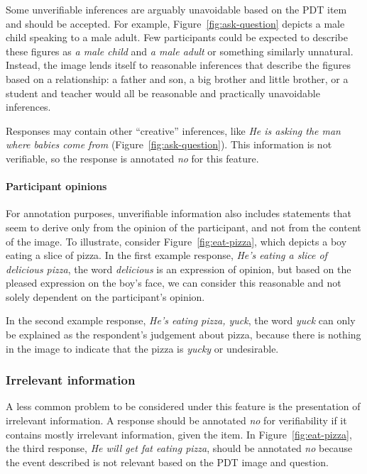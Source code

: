 \documentclass[12pt]{article}
\begin{document}
Some unverifiable inferences are arguably unavoidable based on the PDT item and should be accepted. For example, Figure~\ref{fig:ask-question} depicts a male child speaking to a male adult. Few participants could be expected to describe these figures as \textit{a male child} and \textit{a male adult} or something similarly unnatural. Instead, the image lends itself to reasonable inferences that describe the figures based on a relationship: a father and son, a big brother and little brother, or a student and teacher would all be reasonable and practically unavoidable inferences. 

Responses may contain other ``creative'' inferences, like \textit{He is asking the man where babies come from} (Figure~\ref{fig:ask-question}). This information is not verifiable, so the response is annotated \textit{no} for this feature.

\paragraph{Participant opinions} For annotation purposes, unverifiable information also includes statements that seem to derive only from the opinion of the participant, and not from the content of the image. To illustrate, consider Figure~\ref{fig:eat-pizza}, which depicts a boy eating a slice of pizza. In the first example response, \textit{He's eating a slice of delicious pizza}, the word \textit{delicious} is an expression of opinion, but based on the pleased expression on the boy's face, we can consider this reasonable and not solely dependent on the participant's opinion.

In the second example response, \textit{He's eating pizza, yuck}, the word \textit{yuck} can only be explained as the respondent's judgement about pizza, because there is nothing in the image to indicate that the pizza is \textit{yucky} or undesirable. 

\subsubsection{Irrelevant information} 
A less common problem to be considered under this feature is the presentation of irrelevant information. A response should be annotated \textit{no} for verifiability if it contains mostly irrelevant information, given the item. In Figure~\ref{fig:eat-pizza}, the third response, \textit{He will get fat eating pizza}, should be annotated \textit{no} because the event described is not relevant based on the PDT image and question.
\end{document}
